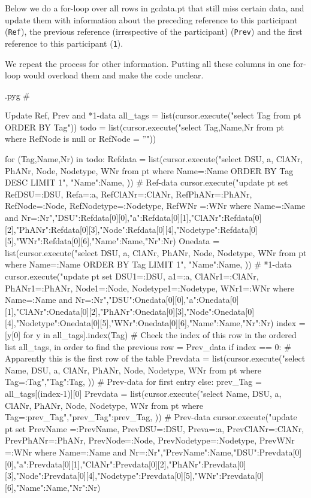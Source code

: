\documentclass{report}
\makeatletter
\newcommand{\mi}[1]{\lstinline{#1}}
\newenvironment{python}{%
  \VerbatimEnvironment
  \minted@resetoptions
  \setkeys{minted@opt}{}
      \begin{VerbatimOut}{\jobname.pyg}}
{%
      \end{VerbatimOut}
      \minted@pygmentize{python}
      \DeleteFile{\jobname.pyg}}
\makeatother
\begin{document}
Below we do a for-loop over all rows in gcdata.pt that still miss certain data,
and update them with information about the preceding reference to this participant (\mi{Ref}),
the previous reference (irrespective of the participant) (\mi{Prev}) and the first reference
to this participant (\mi{1}).

We repeat the process for other information. Putting all these columns in one
for-loop would overload them and make the code unclear.

\begin{python}
#{{{ Update Ref, Prev and *1-data
all_tags = list(cursor.execute("select Tag from pt ORDER BY Tag"))
todo = list(cursor.execute("select Tag,Name,Nr from pt where RefNode is null or RefNode = ''"))

for (Tag,Name,Nr) in todo:
    Refdata = list(cursor.execute("select DSU, a, ClANr, PhANr, Node, Nodetype, WNr from pt where Name=:Name ORDER BY Tag DESC LIMIT 1", {"Name":Name, })) # Ref-data
    cursor.execute("update pt set RefDSU=:DSU, Refa=:a, RefClANr=:ClANr, RefPhANr=:PhANr, RefNode=:Node, RefNodetype=:Nodetype, RefWNr =:WNr where Name=:Name and Nr=:Nr",{"DSU":Refdata[0][0],"a":Refdata[0][1],"ClANr":Refdata[0][2],"PhANr":Refdata[0][3],"Node":Refdata[0][4],"Nodetype":Refdata[0][5],"WNr":Refdata[0][6],"Name":Name,"Nr":Nr}) 
    Onedata = list(cursor.execute("select DSU, a, ClANr, PhANr, Node, Nodetype, WNr from pt where Name=:Name ORDER BY Tag LIMIT 1", {"Name":Name, })) # *1-data
    cursor.execute("update pt set DSU1=:DSU, a1=:a, ClANr1=:ClANr, PhANr1=:PhANr, Node1=:Node, Nodetype1=:Nodetype, WNr1=:WNr where Name=:Name and Nr=:Nr",{"DSU":Onedata[0][0],"a":Onedata[0][1],"ClANr":Onedata[0][2],"PhANr":Onedata[0][3],"Node":Onedata[0][4],"Nodetype":Onedata[0][5],"WNr":Onedata[0][6],"Name":Name,"Nr":Nr}) 
    index = [y[0] for y in all_tags].index(Tag)  # Check the index of this row in the ordered list all_tags, in order to find the previous row = Prev_data 
    if index == 0:  # Apparently this is the first row of the table
        Prevdata = list(cursor.execute("select Name, DSU, a, ClANr, PhANr, Node, Nodetype, WNr from pt where Tag=:Tag",{"Tag":Tag, })) # Prev-data for first entry
    else:
        prev_Tag = all_tags[(index-1)][0]
        Prevdata = list(cursor.execute("select Name, DSU, a, ClANr, PhANr, Node, Nodetype, WNr from pt where Tag=:prev_Tag",{"prev_Tag":prev_Tag, })) # Prev-data
    cursor.execute("update pt set PrevName =:PrevName, PrevDSU=:DSU, Preva=:a, PrevClANr=:ClANr, PrevPhANr=:PhANr, PrevNode=:Node, PrevNodetype=:Nodetype, PrevWNr =:WNr where Name=:Name and Nr=:Nr",{"PrevName":Name,"DSU":Prevdata[0][0],"a":Prevdata[0][1],"ClANr":Prevdata[0][2],"PhANr":Prevdata[0][3],"Node":Prevdata[0][4],"Nodetype":Prevdata[0][5],"WNr":Prevdata[0][6],"Name":Name,"Nr":Nr}) 

}}}
\end{python}
\end{document}
